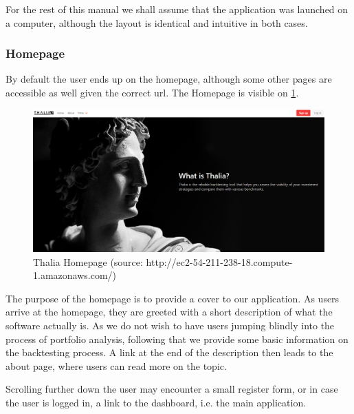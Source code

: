 \documentclass[main.tex]{subfiles}
\begin{document}
For the rest of this manual we shall assume that the application was launched on a computer, although the layout is identical and intuitive in both cases. 

\subsubsection{Homepage}

By default the user ends up on the homepage, although some other pages are accessible as well given the correct url. The Homepage is visible on \figurename{\ref{thalia_home}}.

\begin{figure}[H]
   \centering
   \includegraphics[width=\textwidth]{08Appendices/081User/081Pictures/homepage.png}
   \caption{Thalia Homepage (source: http://ec2-54-211-238-18.compute-1.amazonaws.com/)}
   \label{thalia_home}
\end{figure}

The purpose of the homepage is to provide a cover to our application. As users arrive at the homepage, they are greeted with a short description of what the software actually is.
As we do not wish to have users jumping blindly into the process of portfolio analysis, following that we provide some basic information on the backtesting process. A link at the end of the description then leads to the about page, where users can read more on the topic.

Scrolling further down the user may encounter a small register form, or in case the user is logged in, a link to the dashboard, i.e. the main application.
\end{document}
